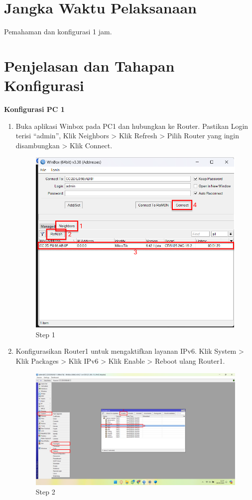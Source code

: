 \section{Jangka Waktu Pelaksanaan}
Pemahaman dan konfigurasi 1 jam.

\section{Penjelasan dan Tahapan Konfigurasi}

\begin{center}
    \textbf{Konfigurasi PC 1}
    \begin{enumerate}

        \item Buka aplikasi Winbox pada PC1 dan hubungkan ke Router. Pastikan Login terisi “admin”, Klik Neighbors > Klik Refresh > Pilih Router yang ingin disambungkan > Klik Connect.
        \begin{figure}[H]
			\centering
			\includegraphics[width=0.5\linewidth]{P5/img/pc1/Step 1.png}
			\caption{Step 1}
			\label{fig:Step 1(PC 1)}
		\end{figure}

        \item Konfigurasikan Router1 untuk mengaktifkan layanan IPv6. Klik System > Klik Packages > Klik IPv6 > Klik Enable > Reboot ulang Router1.
        \begin{figure}[H]
			\centering
			\includegraphics[width=0.5\linewidth]{P5/img/pc1/Step 2.png}
			\caption{Step 2}
			\label{fig:Step 2(PC 1)}
        \end{figure}


\end{enumerate}
\end{center}
